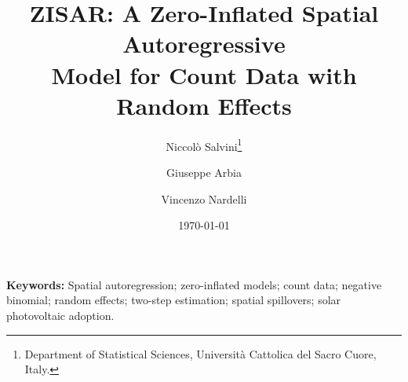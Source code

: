\documentclass[12pt,a4paper]{article}
\title{ZISAR: A Zero-Inflated Spatial Autoregressive\\Model for Count Data with Random Effects}
\author{
  Niccol\`{o} Salvini\thanks{Department of Statistical Sciences, Universit\`{a} Cattolica del Sacro Cuore, Italy.}
  \and
  Giuseppe Arbia\footnotemark[1]
  \and
  Vincenzo Nardelli\footnotemark[1]
}
\date{\today}
\begin{document}
\maketitle

\begin{abstract}

\end{abstract}

\noindent\textbf{Keywords:} Spatial autoregression; zero-inflated models; count data; negative binomial; random effects; two-step estimation; spatial spillovers; solar photovoltaic adoption.

\bigskip
















\newpage


\newpage
\appendix

\end{document}
